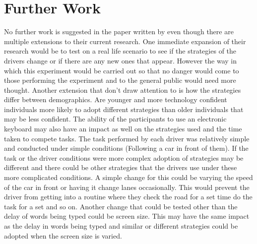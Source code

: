 \documentclass[12pt]{article}
\begin{document}
\section{Further Work}
No further work is suggested in the paper written by \citep{Lee} even though there are multiple extensions to their current research. One immediate expansion of their research would be to test on a real life scenario to see if the strategies of the drivers change or if there are any new ones that appear. However the way in which this experiment would be carried out so that no danger would come to those performing the experiment and to the general public would need more thought. Another extension that \citep{Lee} don't draw attention to is how the strategies differ between demographics. Are younger and more technology confident individuals more likely to adopt different strategies than older individuals that may be less confident. The ability of the participants to use an electronic keyboard may also have an impact as well on the strategies used and the time taken to compete tasks. 
The task performed by each driver was relatively simple and conducted under simple conditions (Following a car in front of them). If the task or the driver conditions were more complex adoption of strategies may be different and there could be other strategies that the drivers use under these more complicated conditions. A simple change for this could be varying the speed of the car in front or having it change lanes occasionally. This would prevent the driver from getting into a routine where they check the road for a set time do the task for a set and so on. 
Another change that could be tested other than the delay of words being typed could be screen size. This may have the same impact as the delay in words being typed and similar or different strategies could be adopted when the screen size is varied.


\end{document}
